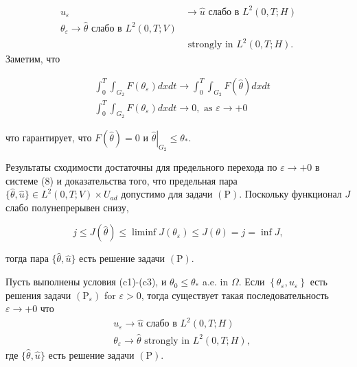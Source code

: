 \[
    \begin{aligned}
        u_{\varepsilon} & \rightarrow \widehat{u} \text { слабо в } L^{2}(0, T ; H) \\
        \theta_{\varepsilon} \rightarrow \widehat{\theta} \text { слабо в } L^{2}(0, T ; V) \\
        & \text { strongly in } L^{2}(0, T ; H).
    \end{aligned}
\]
Заметим, что

\[
    \begin{aligned}
        &\int_{0}^{T} \int_{G_{2}} F\left(\theta_{\varepsilon}\right) d x d t
        \rightarrow \int_{0}^{T} \int_{G_{2}} F(\widehat{\theta}) d x d t \\
        &\int_{0}^{T} \int_{G_{2}} F\left(\theta_{\varepsilon}\right) d x d t
        \rightarrow 0, \text { as } \varepsilon \rightarrow+0
    \end{aligned}
\]

что гарантирует, что $F(\widehat{\theta})=0$ и
$\left.\widehat{\theta}\right|_{G_{2}} \leq \theta_{*}$.

Результаты сходимости достаточны для предельного
перехода по $\varepsilon \rightarrow+0$ в системе (8)
и доказательства того, что предельная пара
$\{\widehat{\theta}, \widehat{u}\} \in L ^{2}(0, T ; V) \times U_{a d}$
допустимо для задачи $(\mathrm{P})$.
Поскольку функционал $J$ слабо полунепрерывен снизу,

\[
    j \leq J(\widehat{\theta})
    \leq \liminf J \left(\theta_{\varepsilon}\right)
    \leq J(\theta)=j=\inf J,
\]

тогда пара $\{\widehat{\theta}, \widehat{u}\}$ есть решение задачи $(\mathrm{P})$.

\begin{theorem}
    \label{th:3_2:3}
Пусть выполнены условия (c1)-(c3), и $\theta_{0} \leq \theta_{*}$ a.e. in $\Omega$.
Если $\left\{\theta_{\varepsilon}, u_{\varepsilon}\right\}$ есть решения задачи
$\left(\mathrm{P}_{\varepsilon}\right)$ for $\varepsilon>0$, тогда существует
такая последовательность$\varepsilon \rightarrow+0$ что
\[
    \begin{aligned}
        &u_{\varepsilon} \rightarrow \widehat{u} \text { слабо в } L^{2}(0, T ; H) \\
        &\theta_{\varepsilon} \rightarrow \widehat{\theta} \text { strongly in } L^{2}(0, T ; H),
    \end{aligned}
\]
где $\{\widehat{\theta}, \widehat{u}\}$ есть решение задачи $(\mathrm{P})$.
\end{theorem}
